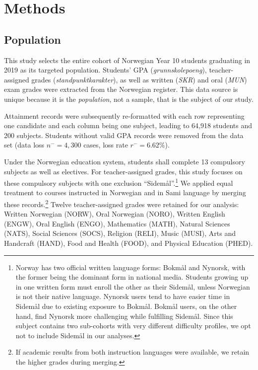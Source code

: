 \section{Methods}

\subsection{Population}

This study selects the entire cohort of Norwegian Year 10 students graduating in 2019 as its targeted population. Students' GPA (\textit{grunnskolepoeng}), teacher-assigned grades (\textit{standpunktkarakter}), as well as written (\textit{SKR}) and oral (\textit{MUN}) exam grades were extracted from the Norwegian register. This data source is unique because it is the \emph{population}, not a sample, that is the subject of our study.

Attainment records were subsequently re-formatted with each row representing one candidate and each column being one subject, leading to 64,918 students and 200 subjects. Students without valid GPA records were removed from the data set (data loss $n^-= 4,300$ cases, loss rate $r^- = 6.62\%$).

Under the Norwegian education system, students shall complete 13 compulsory subjects as well as electives. For teacher-assigned grades, this study focuses on these compulsory subjects with one exclusion ``Sidem{\aa}l''.\footnote{Norway has two official written language forms: Bokm{\aa}l and Nynorsk, with the former being the dominant form in national media. Students growing up in one written form must enroll the other as their Sidem{\aa}l, unless Norwegian is not their native language. Nynorsk users tend to have easier time in Sidem{\aa}l due to existing exposure to Bokm{\aa}l. Bokm{\aa}l users, on the other hand, find Nynorsk more challenging while fulfilling Sidem{\aa}l. Since this subject contains two sub-cohorts with very different difficulty profiles, we opt not to include Sidem{\aa}l in our analyses.} We applied equal treatment to courses instructed in Norwegian and in Sami language by merging these records.\footnote{If academic results from both instruction languages were available, we retain the higher grades during merging.} Twelve teacher-assigned grades were retained for our analysis: Written Norwegian (NORW), Oral Norwegian (NORO), Written English (ENGW), Oral English (ENGO), Mathematics (MATH), Natural Sciences (NATS), Social Sciences (SOCS), Religion (RELI), Music (MUSI), Arts and Handcraft (HAND), Food and Health (FOOD), and Physical Education (PHED).

